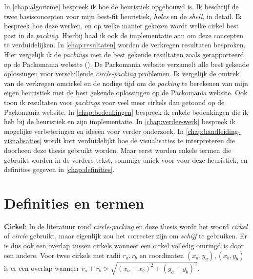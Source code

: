 \documentclass[12pt,a4paper,oneside]{book}
\begin{document}
In \autoref{chap:algoritme} bespreek ik hoe de heuristiek opgebouwd is.
Ik beschrijf de twee basisconcepten voor mijn best-fit heuristiek, \textit{holes} en de \textit{shell}, in detail.
Ik bespreek hoe deze werken, en op welke manier gekozen wordt welke cirkel best past in de \textit{packing}.
Hierbij haal ik ook de implementatie aan om deze concepten te verduidelijken.
In \autoref{chap:resultaten} worden de verkregen resultaten besproken.
Hier vergelijk ik de \textit{packings} met de best gekende resultaten zoals gerapporteerd op de Packomania website (\cite{packomania}).
De Packomania website verzamelt alle best gekende oplossingen voor verschillende \textit{circle-packing} problemen.
Ik vergelijk de omtrek van de verkregen omcirkel en de nodige tijd om de \textit{packing} te berekenen van mijn eigen heuristiek met de best gekende oplossingen op de Packomania website.
Ook toon ik resultaten voor \textit{packings} voor veel meer cirkels dan getoond op de Packomania website.
In \autoref{chap:bedenkingen} bespreek ik enkele bedenkingen die ik heb bij de heuristiek en zijn implementatie.
In \autoref{chap:verder-werk} bespreek ik mogelijke verbeteringen en ideeën voor verder onderzoek.
In \autoref{chap:handleiding-visualisaties} wordt kort verduidelijkt hoe de visualisaties te interpreteren die doorheen deze thesis gebruikt worden.
Maar eerst worden enkele termen die gebruikt worden in de verdere tekst, sommige uniek voor voor deze heuristiek, en definities gegeven in \autoref{chap:definities}.


\chapter{Definities en termen} \label{chap:definities}

\textbf{Cirkel}: In de literatuur rond \textit{circle-packing} en deze thesis wordt het woord \textit{cirkel} of \textit{circle} gebruikt, maar eigenlijk zou het correcter zijn om \textit{schijf} te gebruiken.
Er is dus ook een overlap tussen cirkels wanneer een cirkel volledig omringd is door een andere.
Voor twee cirkels met radii $r_a, r_b$ en coordinaten  $(x_a,y_a), (x_b,y_b)$ is er een overlap wanneer $r_a + r_b > \sqrt{(x_a-x_b)^2 + (y_a-y_b)^2}$. 
\end{document}

